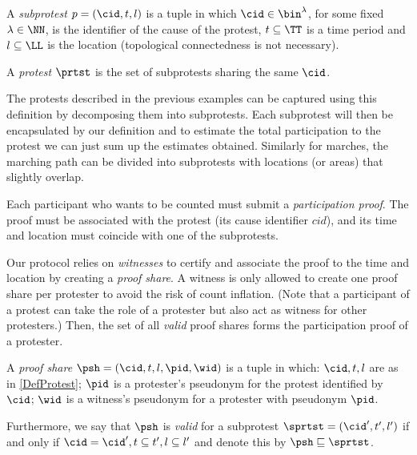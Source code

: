 \begin{definition}\label{DefProtest}
  A \emph{subprotest} \(p = (\cid, t, l)\) is a tuple in which \(\cid\in 
    \bin^{\lambda}\), for some fixed \(\lambda\in \NN\), is the identifier of 
  the cause of the protest, \(t \subseteq \TT\) is a time period and \(l 
    \subseteq \LL\) is the location (topological connectedness is not 
  necessary).

  A \emph{protest} \(\prtst\) is the set of subprotests sharing the same \(\cid\).
\end{definition}

The protests described in the previous examples can be captured using this definition by decomposing them into subprotests.
Each subprotest will then be encapsulated by our definition and to estimate the total participation to the protest we can just sum up the estimates obtained.
Similarly for marches, the marching path can be divided into subprotests with locations (or areas) that slightly overlap.

Each participant who wants to be counted must submit a \emph{participation proof}.
The proof must be associated with the protest (\ie its cause identifier \(cid\)), and its time and location must coincide with one of the subprotests.

Our protocol relies on \emph{witnesses} to certify and associate the proof to the time and location by creating a \emph{proof share}.
A witness is only allowed to create one proof share per protester to avoid the risk of count inflation.
(Note that a participant of a protest can take the role of a protester but also 
act as witness for other protesters.)
Then, the set of all \emph{valid} proof shares forms the participation proof of a protester.


\begin{definition}%
  \label{DefProofShare}\label{DefProofShares}
  A \emph{proof share} \(\psh = (\cid, t, l, \pid, \wid)\) is a tuple in which: 
  \(\cid, t, l\) are as in \cref{DefProtest};
  \(\pid\) is a protester's pseudonym for the protest identified by \(\cid\);
  \(\wid\) is a witness's pseudonym for a protester with pseudonym \(\pid\).

  Furthermore, we say that \(\psh\) is \emph{valid} for a subprotest \(\sprtst = (\cid', t', l')\) if and only if \(\cid = \cid', t\subseteq t', l\subseteq l'\) and denote this by 
  \(\psh \sqsubseteq \sprtst\).
\end{definition}

